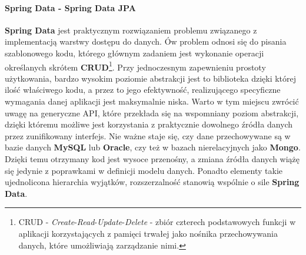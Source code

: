 	\paragraph{Spring Data - Spring Data JPA}
	\label{app:spring_data}
	\textbf{Spring Data} jest praktycznym rozwiązaniem problemu związanego z implementacją warstwy dostępu do danych. 
	Ów problem odnosi się do pisania szablonowego kodu, którego głównym zadaniem jest wykonanie operacji określanych 
	skrótem \textbf{CRUD}\footnote{CRUD - \textit{Create}-\textit{Read}-\textit{Update}-\textit{Delete} - zbiór czterech 
	podstawowych funkcji w aplikacji korzystających z pamięci trwałej jako nośnika przechowywania danych, które 
	umożliwiają zarządzanie nimi.}. Przy jednoczesnym zapewnieniu prostoty użytkowania, bardzo wysokim poziomie 
	abstrakcji jest to biblioteka dzięki której ilość właściwego kodu, a przez to jego efektywność, realizującego 
	specyficzne wymagania danej aplikacji jest maksymalnie niska. Warto w tym miejscu zwrócić uwagę na generyczne 
	API, które przekłada się na wspomniany poziom abstrakcji, dzięki któremu możliwe jest korzystania z praktycznie
	dowolnego źródła danych przez zunifikowany interfejs. Nie ważne staje się, czy dane przechowywane są w bazie 
	danych \textbf{MySQL} lub \textbf{Oracle}, czy też w bazach nierelacyjnych jako \textbf{Mongo}. 
	Dzięki temu otrzymany kod jest wysoce przenośny, a zmiana źródła danych wiążę się jedynie z poprawkami 
	w definicji modelu danych. Ponadto elementy takie ujednolicona hierarchia wyjątków, rozszerzalność 
	stanowią wspólnie o sile \textbf{Spring Data}.
	
